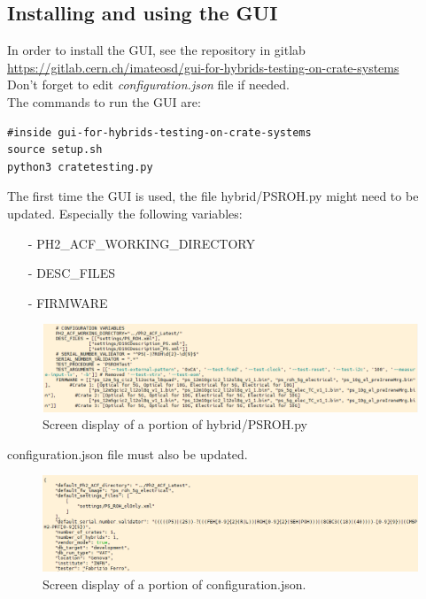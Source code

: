 \documentclass[10pt,a4paper]{article}
\begin{document}
\subsection{Installing and using the GUI}
In order to install the GUI, see the repository in gitlab \\
\url{https://gitlab.cern.ch/imateosd/gui-for-hybrids-testing-on-crate-systems}\\

Don't forget to edit {\it configuration.json} file if needed. \\

The commands to run the GUI are:

\begin{framed}
\begin{verbatim}
#inside gui-for-hybrids-testing-on-crate-systems
source setup.sh
python3 cratetesting.py
\end{verbatim}
\end{framed}

The first time the GUI is used, the file hybrid/PSROH.py might need to be updated. Especially the following variables:
\begin{itemize}
\item[-] PH2\_ACF\_WORKING\_DIRECTORY
\item[-] DESC\_FILES
\item[-] FIRMWARE
\end{itemize}

\begin{figure}[h!]
\centering
 \includegraphics[width=\linewidth]{psroh.png} 
  \caption{Screen display of a portion of hybrid/PSROH.py}
  \label{screenshot}	
\end{figure}

configuration.json file must also be updated.
\begin{figure}[h!]
\centering
 \includegraphics[width=\linewidth]{configuration.png} 
  \caption{Screen display of a portion of configuration.json.}
\end{figure}
\end{document}

